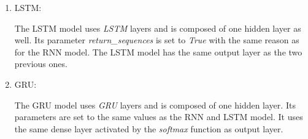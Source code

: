 \begin{enumerate}[label=\arabic*.]
\newpage

  \item LSTM:
    
    The LSTM model uses \textit{LSTM} layers and is composed of one hidden layer
    as well. Its parameter \textit{return\_sequences} is set to \textit{True}
    with the same reason as for the RNN model. The LSTM model has the same
    output layer as the two previous ones.\\
  \item GRU:
    
    The GRU model uses \textit{GRU} layers and is composed of one hidden layer.
    Its parameters are set to the same values as the RNN and LSTM model. It uses
    the same dense layer activated by the \textit{softmax} function as output
    layer.
\end{enumerate}
